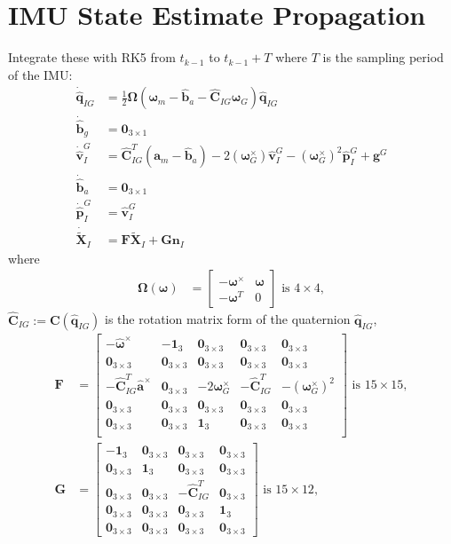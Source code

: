 \documentclass[10pt,letterpaper,fleqn,oneside]{article}
\newcommand{\nl}{\\[0.5em]}
\def\Vec#1{\mathbf{#1}} %
\newcommand{\bbm}{\begin{bmatrix}}
\newcommand{\ebm}{\end{bmatrix}}
\begin{document}
\section{IMU State Estimate Propagation}
Integrate these with RK5 from $t_{k-1}$ to $t_{k-1} + T$ where $T$ is the sampling period of the IMU:
\begin{align}
\dot{\hat{\Vec{q}}}_{I G} &= \frac{1}{2}\boldsymbol{\Omega}\left(\boldsymbol{\omega}_m - \hat{\Vec{b}}_a - \hat{\Vec{C}}_{I G} \boldsymbol{\omega}_G \right)\hat{\Vec{q}}_{I G} \nl
\dot{\hat{\Vec{b}}}_g  &= \Vec{0}_{3\times1} \nl
\dot{\hat{\Vec{v}}}^G_I &= \hat{\Vec{C}}_{I G}^T\left(\Vec{a}_m - \hat{\Vec{b}}_a\right) - 2\left(\boldsymbol{\omega}_G^\times\right)\hat{\Vec{v}}^G_I - \left(\boldsymbol{\omega}_G^\times\right)^2 \left.\hat{\Vec{p}}^G_I\right. + \Vec{g}^G \nl
\dot{\hat{\Vec{b}}}_a &= \Vec{0}_{3\times1} \nl
\dot{\hat{\Vec{p}}}^G_I &= \hat{\Vec{v}}^G_I \nl
\dot{\widetilde{\Vec{X}}}_I &= \Vec{F}\widetilde{\Vec{X}}_I + \Vec{G}\Vec{n}_I
\end{align}
where
\begin{align}
\boldsymbol{\Omega}\left(\boldsymbol{\omega}\right) &= \bbm -\boldsymbol{\omega}^\times & \boldsymbol{\omega} \nl
																										-\boldsymbol{\omega}^T & 0
																								\ebm 
																								\text{ is }4\times4,
\end{align}
$\hat{\Vec{C}}_{I G} := \Vec{C}(\hat{\Vec{q}}_{I G})$ is the rotation matrix form of the quaternion $\hat{\Vec{q}}_{I G}$,
\begin{align}
\Vec{F} &= \bbm	-\hat{\boldsymbol{\omega}}^\times & -\Vec{1}_3 & \Vec{0}_{3\times3} & \Vec{0}_{3\times3} & \Vec{0}_{3\times3} \nl
					\Vec{0}_{3\times3} & \Vec{0}_{3\times3} & \Vec{0}_{3\times3} & \Vec{0}_{3\times3} & \Vec{0}_{3\times3} \nl
					-\hat{\Vec{C}}_{I G}^T\hat{\Vec{a}}^\times & \Vec{0}_{3\times3} & -2\boldsymbol{\omega}_G^\times & -\hat{\Vec{C}}_{I G}^T & -\left(\boldsymbol{\omega}_G^\times\right)^2 \nl
					\Vec{0}_{3\times3} & \Vec{0}_{3\times3} & \Vec{0}_{3\times3} & \Vec{0}_{3\times3} & \Vec{0}_{3\times3} \nl
					\Vec{0}_{3\times3} & \Vec{0}_{3\times3} & \Vec{1}_3 & \Vec{0}_{3\times3} & \Vec{0}_{3\times3} \nl
		\ebm \text{ is } 15\times15, \nl
\Vec{G} &= 	\bbm	-\Vec{1}_3 & \Vec{0}_{3\times3} & \Vec{0}_{3\times3} & \Vec{0}_{3\times3} \nl
								\Vec{0}_{3\times3} & \Vec{1}_3 & \Vec{0}_{3\times3} & \Vec{0}_{3\times3} \nl
								\Vec{0}_{3\times3} & \Vec{0}_{3\times3} & -\hat{\Vec{C}}_{I G}^T & \Vec{0}_{3\times3} \nl
								\Vec{0}_{3\times3} & \Vec{0}_{3\times3} & \Vec{0}_{3\times3} & \Vec{1}_3 \nl
								\Vec{0}_{3\times3} & \Vec{0}_{3\times3} & \Vec{0}_{3\times3} & \Vec{0}_{3\times3}
					\ebm \text{ is } 15\times12,
\end{align}
\end{document}
